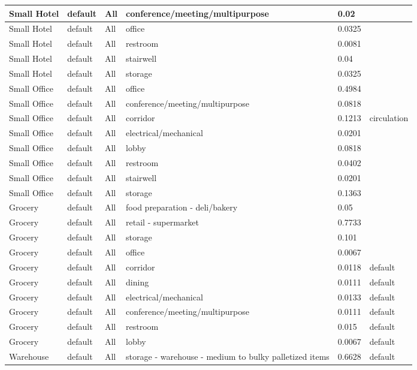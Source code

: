 \begin{center}
\begin{longtable}{|p{1.0in}|p{1.05in}|p{1.1in}|p{1.9in}|p{0.55in}|p{0.95in}|}
Small Hotel & default & All & conference/meeting/multipurpose & 0.02 &  \\ \hline
Small Hotel & default & All & office & 0.0325 &  \\ \hline
Small Hotel & default & All & restroom & 0.0081 &  \\ \hline
Small Hotel & default & All & stairwell & 0.04 &  \\ \hline
Small Hotel & default & All & storage & 0.0325 &  \\ \hline
Small Office & default & All & office & 0.4984 &  \\ \hline
Small Office & default & All & conference/meeting/multipurpose & 0.0818 &  \\ \hline
Small Office & default & All & corridor & 0.1213 & circulation \\ \hline
Small Office & default & All & electrical/mechanical & 0.0201 &  \\ \hline
Small Office & default & All & lobby & 0.0818 &  \\ \hline
Small Office & default & All & restroom & 0.0402 &  \\ \hline
Small Office & default & All & stairwell & 0.0201 &  \\ \hline
Small Office & default & All & storage & 0.1363 &  \\ \hline
Grocery & default & All & food preparation - deli/bakery & 0.05 &  \\ \hline
Grocery & default & All & retail - supermarket & 0.7733 &  \\ \hline
Grocery & default & All & storage & 0.101 &  \\ \hline
Grocery & default & All & office & 0.0067 &  \\ \hline
Grocery & default & All & corridor & 0.0118 & default \\ \hline
Grocery & default & All & dining & 0.0111 & default \\ \hline
Grocery & default & All & electrical/mechanical & 0.0133 & default \\ \hline
Grocery & default & All & conference/meeting/multipurpose & 0.0111 & default \\ \hline
Grocery & default & All & restroom & 0.015 & default \\ \hline
Grocery & default & All & lobby & 0.0067 & default \\ \hline
Warehouse & default & All & storage - warehouse - medium to bulky palletized items & 0.6628 & default \\ \hline

\end{longtable}
\end{center}
